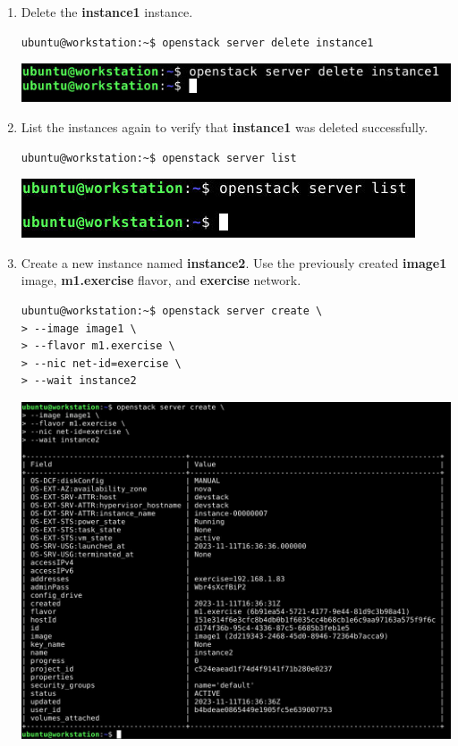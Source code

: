 \documentclass[letterpaper, 12pt]{article}
\begin{document}
\begin{enumerate}
    \item Delete the \textbf{instance1} instance.
\begin{lstlisting}
ubuntu@workstation:~$ openstack server delete instance1
\end{lstlisting}

    \begin{center}
        \includegraphics[width=\linewidth]{images/part4/step10.png}
    \end{center}

    \item List the instances again to verify that \textbf{instance1} was deleted successfully.
\begin{lstlisting}
ubuntu@workstation:~$ openstack server list
\end{lstlisting}

    \begin{center}
        \includegraphics[width=\linewidth]{images/part4/step11.png}
    \end{center}

    \item Create a new instance named \textbf{instance2}. Use the previously created \textbf{image1} image,
    \textbf{m1.exercise} flavor, and \textbf{exercise} network.
\begin{lstlisting}
ubuntu@workstation:~$ openstack server create \
> --image image1 \
> --flavor m1.exercise \
> --nic net-id=exercise \
> --wait instance2
\end{lstlisting}

    \begin{center}
        \includegraphics[width=\linewidth]{images/part4/step12.png}
    \end{center}


\end{enumerate}
\end{document}
